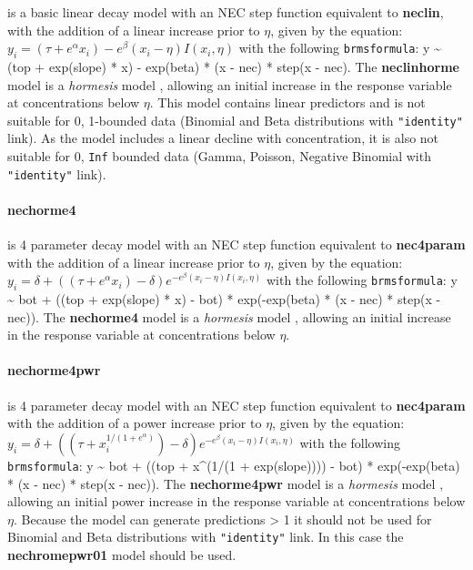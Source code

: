 \documentclass[
  shortnames]{jss}
\begin{document}
is a basic linear decay model with an NEC step function equivalent to \textbf{neclin}, with the addition of a linear increase prior to \(\eta\), given by the equation:
\(y_i = (\tau + e^{\alpha} x_i) - e^{\beta} \left(x_i - \eta \right) I(x_i, \eta)\)
with the following \texttt{brmsformula}: y \textasciitilde{} (top + exp(slope) * x) - exp(beta) * (x - nec) * step(x - nec). The \textbf{neclinhorme} model is a \emph{hormesis} model \citep{Mattson2008}, allowing an initial increase in the response variable at concentrations below \(\eta\). This model contains linear predictors and is not suitable for 0, 1-bounded data (Binomial and Beta distributions with \texttt{"identity"} link). As the model includes a linear decline with concentration, it is also not suitable for 0, \texttt{Inf} bounded data (Gamma, Poisson, Negative Binomial with \texttt{"identity"} link).

\hypertarget{nechorme4}{%
\paragraph{nechorme4}\label{nechorme4}}

is 4 parameter decay model with an NEC step function equivalent to \textbf{nec4param} with the addition of a linear increase prior to \(\eta\), given by the equation:
\(y_i = \delta + ((\tau + e^{\alpha} x_i) - \delta ) e^{-e^{\beta} \left(x_i - \eta \right) I(x_i, \eta)}\)
with the following \texttt{brmsformula}: y \textasciitilde{} bot + ((top + exp(slope) * x) - bot) * exp(-exp(beta) * (x - nec) * step(x - nec)). The \textbf{nechorme4} model is a \emph{hormesis} model \citep{Mattson2008}, allowing an initial increase in the response variable at concentrations below \(\eta\).

\hypertarget{nechorme4pwr}{%
\paragraph{nechorme4pwr}\label{nechorme4pwr}}

is 4 parameter decay model with an NEC step function equivalent to \textbf{nec4param} with the addition of a power increase prior to \(\eta\), given by the equation:
\(y_i = \delta + ((\tau + x_i^{1/(1+e^{\alpha})}) - \delta) e^{-e^{\beta} \left(x_i - \eta \right) I(x_i, \eta)}\)
with the following \texttt{brmsformula}: y \textasciitilde{} bot + ((top + x\^{}(1/(1 + exp(slope)))) - bot) * exp(-exp(beta) * (x - nec) * step(x - nec)). The \textbf{nechorme4pwr} model is a \emph{hormesis} model \citep{Mattson2008}, allowing an initial power increase in the response variable at concentrations below \(\eta\). Because the model can generate predictions \textgreater{} 1 it should not be used for Binomial and Beta distributions with \texttt{"identity"} link. In this case the \textbf{nechromepwr01} model should be used.
\end{document}
